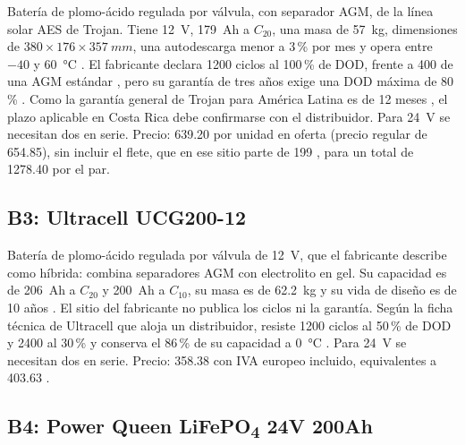 Batería de plomo-ácido regulada por válvula, con separador AGM, de la línea solar AES de Trojan. Tiene \SI{12}{V}, \SI{179}{Ah} a $C_{20}$, una masa de \SI{57}{kg}, dimensiones de $380 \times 176 \times \SI{357}{mm}$, una autodescarga menor a 3\,\% por mes y opera entre $-40$ y \SI{60}{\celsius} \cite{trojan_saes}. El fabricante declara 1200 ciclos al 100\,\% de DOD, frente a 400 de una AGM estándar \cite{trojan_saes_web}, pero su garantía de tres años exige una DOD máxima de 80\,\% \cite{trojan_aes_war}. Como la garantía general de Trojan para América Latina es de 12 meses \cite{trojan_latam}, el plazo aplicable en Costa Rica debe confirmarse con el distribuidor. Para \SI{24}{V} se necesitan dos en serie. Precio: \SI{639.20}{\USD} por unidad en oferta (precio regular de \SI{654.85}{\USD}), sin incluir el flete, que en ese sitio parte de \SI{199}{\USD} \cite{precio_b2}, para un total de \SI{1278.40}{\USD} por el par.

\subsection{B3: Ultracell UCG200-12}

Batería de plomo-ácido regulada por válvula de \SI{12}{V}, que el fabricante describe como híbrida: combina separadores AGM con electrolito en gel. Su capacidad es de \SI{206}{Ah} a $C_{20}$ y \SI{200}{Ah} a $C_{10}$, su masa es de \SI{62.2}{kg} y su vida de diseño es de 10 años \cite{ultracell_web}. El sitio del fabricante no publica los ciclos ni la garantía. Según la ficha técnica de Ultracell que aloja un distribuidor, resiste 1200 ciclos al 50\,\% de DOD y 2400 al 30\,\% y conserva el 86\,\% de su capacidad a \SI{0}{\celsius} \cite{ultracell}. Para \SI{24}{V} se necesitan dos en serie. Precio: \SI{358.38}{\EUR} con IVA europeo incluido, equivalentes a \SI{403.63}{\USD} \cite{wattuneed}.

\subsection{B4: Power Queen LiFePO\textsubscript{4} 24V 200Ah}


